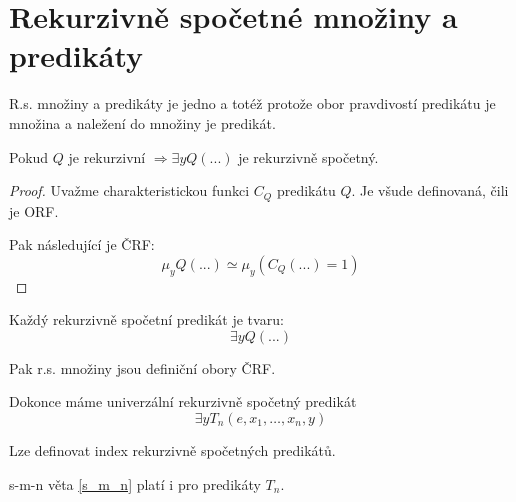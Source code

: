 \section{\texorpdfstring{Rekurzivně spočetné množiny a predikáty}{Rekurzivně spočetné množiny a predikáty}}
\vspace{5mm}
\large

\begin{note}
	R.s. množiny a predikáty je jedno a totéž protože obor pravdivostí predikátu je množina a naležení do množiny je predikát.
\end{note}

\begin{lemma}[$\exists Q$ r.s]
	Pokud $Q$ je rekurzivní $\Rightarrow \exists y Q(...)$ je rekurzivně spočetný.
\end{lemma}
\begin{proof}
	Uvažme charakteristickou funkci $C_Q$ predikátu $Q$.
	Je všude definovaná, čili je ORF.

	Pak následující je ČRF:
	\[ \mu_y Q(...) \simeq \mu_y (C_Q(...) = 1) \]
\end{proof}

\begin{theorem}\label{univ_predic}
	Každý rekurzivně spočetní predikát je tvaru:
	\[ \exists y Q(...) \]

	Pak r.s. množiny jsou definiční obory ČRF.

	Dokonce máme univerzální rekurzivně spočetný predikát
	\[ \exists y T_n(e, x_1, \ldots, x_n, y) \]
\end{theorem}

\begin{consequence}
	Lze definovat index rekurzivně spočetných predikátů.
\end{consequence}

\begin{note}
	s-m-n věta \cref{s_m_n} platí i pro predikáty $T_n$.
\end{note}

